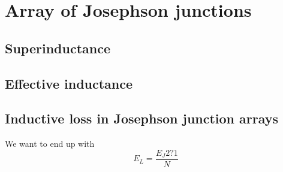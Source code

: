 \chapter{Array of Josephson junctions}\label{chap:jj_array}

\section{Superinductance}
\section{Effective inductance}
\section{Inductive loss in Josephson junction arrays}

We want to end up with 
\begin{equation}
    E_L = \frac{E_J2?1}{N}
\end{equation}